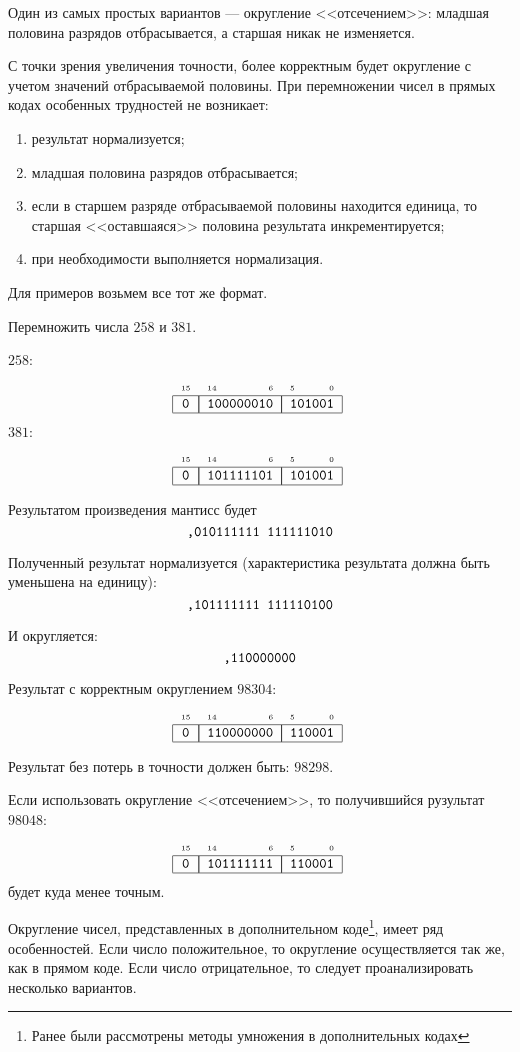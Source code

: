 Один из самых простых вариантов --- округление <<отсечением>>: младшая половина разрядов отбрасывается, а старшая никак не изменяется.

С точки зрения увеличения точности, более корректным будет округление с учетом значений отбрасываемой половины. При перемножении чисел в прямых кодах особенных трудностей не возникает:
\begin{enumerate}
    \item результат нормализуется;
    \item младшая половина разрядов отбрасывается;
    \item если в старшем разряде отбрасываемой половины находится единица, то старшая <<оставшаяся>> половина результата инкрементируется;
    \item при необходимости выполняется нормализация.
\end{enumerate}

Для примеров возьмем все тот же формат.

\begin{Example}
    Перемножить числа $258$ и $381$.
\end{Example}
\begin{Solve}
    $258$:
    \[
        \FloatMyCharHex{0}{100000010}{101001}
    \]
    $381$:
    \[
        \FloatMyCharHex{0}{101111101}{101001}
    \]
    
    Результатом произведения мантисс будет
    \[
        \texttt{,010111111 111111010}
    \]
    
    Полученный результат нормализуется (характеристика результата должна быть уменьшена на единицу):
    \[
        \texttt{,101111111 111110100}
    \]
    
    И округляется:
    \[
        \texttt{,110000000}
    \]

    Результат с корректным округлением $98304$:
    \[
        \FloatMyCharHex{0}{110000000}{110001}
    \]
    
    Результат без потерь в точности должен быть: $98298$. 
    
    Если использовать округление <<отсечением>>, то получившийся рузультат $98048$:
    \[
        \FloatMyCharHex{0}{101111111}{110001}
    \]
    будет куда менее точным.
\end{Solve}

Округление чисел, представленных в дополнительном коде\footnote{Ранее были рассмотрены методы умножения в дополнительных кодах}, имеет ряд особенностей. Если число положительное, то округление осуществляется так же, как в прямом коде. Если число отрицательное, то следует проанализировать несколько вариантов.

